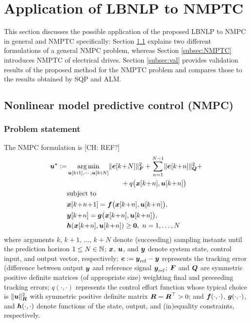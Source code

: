 \documentclass[journal]{IEEEtranTIE}
\newcommand{\CHHA}[1]{{\color{red} [CH: #1]}} %
\begin{document}
\section{Application of LBNLP to NMPTC}
\label{sec:Application to NMPTC}

This section discusses the possible application of the proposed LBNLP to NMPC in general and NMPTC specifically: Section \ref{subsec:NMPC} explains two different formulations of a general NMPC problem,  whereas Section \ref{subsec:NMPTC} introduces NMPTC of electrical drives. Section \ref{subsec:val} provides validation results of the proposed method for the NMPTC problem and compares those to the results obtained by SQP and ALM.

\subsection{Nonlinear model predictive control (NMPC)}
\label{subsec:NMPC}

\subsubsection{Problem statement}

The NMPC formulation is \CHHA{REF?}
\begin{subequations}\label{eq:NMPC1}
\begin{align}
\mv{u}^\star:=&\mathop {\rm arg\min }\limits_{\mv{u}[k\!+\!1], \cdots ,\mv{u}[k\!+\!N]} \norm{\mv{e}[k\!+\!N]}_{\mm{F}}^2 + \sum\limits_{n = 1}^{N - 1} \norm{\mv{e}[k\!+\!n]}_{\mm{Q}}^2 + \nonumber \\ 
& \qquad \qquad \qquad \qquad + q\big( \mv{x}[k\!+\!n],\mv{u}[k\!+\!n] \big) \label{eq:NMPC1 - objective function} \\
&{\rm{subject\ to}} \nonumber\\
&\mv{x}[k\!+\!n\!+\!1] = \mv{f}\big( \mv{x}[k\!+\!n] ,\mv{u}[k\!+\!n] \big), \\ &\mv{y}[k\!+\!n]  = \mv{g}\big(\mv{x}[k\!+\!n], \mv{u}[k\!+\!n] \big), \\
&\mv{h}(\mv{x}[k\!+\!n],\mv{u}[k\!+\!n]) \ge \mv{0},\ n = 1, \ldots ,N %
\end{align}
\end{subequations}
where arguments $k$, $k\!+\!1$, $\dots$, $k\!+\!N$ denote (succeeding) sampling instants until the prediction horizon  $1 \leq N \in \mathbb{N}$; $\boldsymbol{x}$, $\boldsymbol{u}$, and $\boldsymbol{y}$ denote system state, control input, and output vector, respectively; $\boldsymbol{e} := \boldsymbol{y}_{\mathrm{ref}} - \boldsymbol{y}$ represents the tracking error (difference between output $\boldsymbol{y}$ and reference signal $\boldsymbol{y}_{\mathrm{ref}}$; $\boldsymbol{F}$ and $\boldsymbol{Q}$ are symmetric positive definite matrices (of appropriate size) weighting final and preceeding tracking errors; $q(\cdot, \cdot)$ represents the control effort function whose typical choice is $\lVert  \boldsymbol{u}  \rVert_{\boldsymbol{R}}^2$ with symmetric positive definite matrix $\boldsymbol{R}=\boldsymbol{R}^\top >0$; and $\boldsymbol{f}(\cdot,\cdot)$, $\boldsymbol{g}(\cdot,\cdot)$, and $\boldsymbol{h}(\cdot,\cdot)$ denote functions of the state, output, and (in)equality constraints, respectively. 
\end{document}
